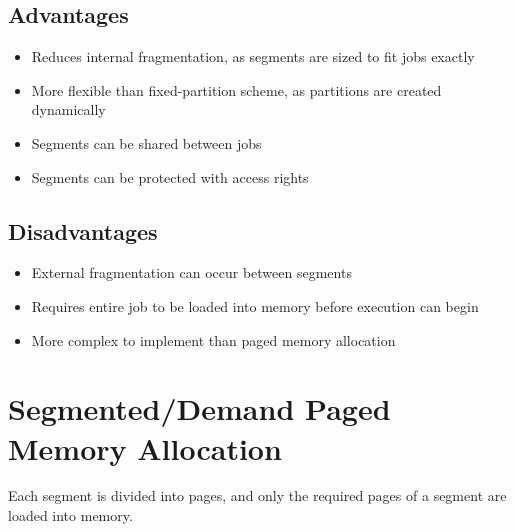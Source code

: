 \documentclass[12pt letter]{report}
\begin{document}
\subsection{Advantages}
\begin{itemize}
  \item Reduces internal fragmentation, as segments are sized to fit jobs exactly
  \item More flexible than fixed-partition scheme, as partitions are created dynamically
  \item Segments can be shared between jobs
  \item Segments can be protected with access rights
\end{itemize}

\subsection{Disadvantages}
\begin{itemize}
  \item External fragmentation can occur between segments
  \item Requires entire job to be loaded into memory before execution can begin
  \item More complex to implement than paged memory allocation
\end{itemize}

\section{Segmented/Demand Paged Memory Allocation}

Each segment is divided into pages, and only the required pages of a segment are loaded into memory.
\end{document}
